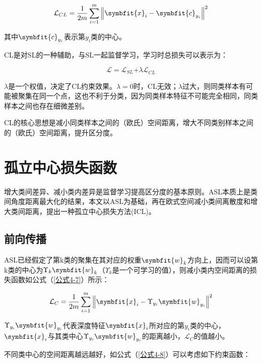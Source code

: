 \begin{equation}\label{公式4-5}
	\mathcal{L}_{C L}=\frac{1}{2 m} \sum_{i=1}^{m}\left\|\symbfit{x}_{i}-\symbfit{c}_{y_{i}}\right\|^{2}
\end{equation}

其中$\symbfit{c}_{y_i}$表示第$y_i$类的中心。

CL是对SL的一种辅助，与SL一起监督学习，学习时总损失可以表示为：

\begin{equation}\label{公式4-6}
	\mathcal{L}=\mathcal{L}_{SL}{+\lambda\mathcal{L}}_{CL}
\end{equation}


$\lambda$是一个权值，决定了CL约束效果。$\lambda=0$时，CL无效；$\lambda$过大，则同类样本有可能被聚集在同一个点，这也不利于分类，因为同类样本特征不可能完全相同，同类样本之间也存在细微差别。

CL的核心思想是减小同类样本之间的（欧氏）空间距离，增大不同类别样本之间的（欧氏）空间距离，提升区分度。


\section{孤立中心损失函数}

增大类间差异、减小类内差异是监督学习提高区分度的基本原则。ASL本质上是类间角度距离最大化的结果，本文以ASL为基础，再在欧式空间减小类间离散度和增大类间距离，提出一种孤立中心损失方法(ICL)。

\subsection{前向传播}

ASL已经假定了第k类的聚集在其对应的权重$\symbfit{w}_k$方向上，因而可以设第k类的中心为$\Upsilon_{k} \symbfit{w}_{k}$（$\Upsilon_{k}$是一个可学习的值），则减小类内空间距离的损失函数如公式（\ref{公式4-7}）所示：


\begin{equation}\label{公式4-7}
	\mathcal{L}_{C}=\frac{1}{2 m} \sum_{i=1}^{m}\left\|\symbfit{x}_{i}-\Upsilon_{y_{i}} \symbfit{w}_{y_{i}}\right\|^{2}
\end{equation}

$\Upsilon_{y_{i}} \symbfit{w}_{y_{i}}$代表深度特征$\symbfit{x}_i$所对应的第$y_i$类的中心，$\symbfit{x}_i$与其类中心$\Upsilon_{y_{i}} \symbfit{w}_{y_{i}}$的距离越小，$\mathcal{L}_C$的值越小。

不同类中心的空间距离越远越好，如公式（\ref{公式4-8}）可以考虑如下约束函数：

